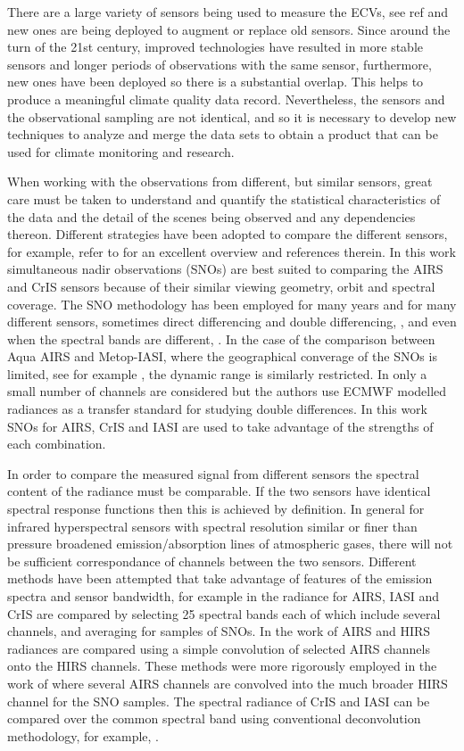 \documentclass[twocolumn,10pt]{article}
\begin{document}
There are a large variety of sensors being used to measure the ECVs, see ref \cite{Hollmann2013} and new ones are being deployed to augment or replace old sensors.  Since around the turn of the 21st century, improved technologies have resulted in more stable sensors and longer periods of observations with the same sensor, furthermore, new ones have been deployed so there is a substantial overlap. This helps to produce a meaningful climate quality data record. Nevertheless, the sensors and the observational sampling are not identical, and so it is necessary to develop new techniques to analyze and merge the data sets to obtain a product that can be used for climate monitoring and research.

When working with the observations from different, but similar sensors, great care must be taken to understand and quantify the statistical characteristics of the data and the detail of the scenes being observed and any dependencies thereon. Different strategies have been adopted to compare the different sensors, for example, refer to \cite{Chander2013} for an excellent overview and references therein. In this work simultaneous nadir observations (SNOs) are best suited to comparing the AIRS and CrIS sensors because of their similar viewing geometry, orbit and spectral coverage. The SNO methodology has been employed for many years and for many different sensors, sometimes direct differencing \cite{Wang2007} and double differencing, \cite{Wang2011}, and even when the spectral bands are different, \cite{Uprety2013}. In the case of the comparison between Aqua AIRS and Metop-IASI, where the geographical converage of the SNOs is limited, see for example \cite{GSICS2008}, the dynamic range is similarly restricted. In \cite{Elliott2009} only a small number of channels are considered but the authors use ECMWF modelled radiances as a transfer standard for studying double differences. In this work SNOs for AIRS, CrIS and IASI are used to take advantage of the strengths of each combination.

In order to compare the measured signal from different sensors the spectral content of the radiance must be comparable. If the two sensors have identical spectral response functions then this is achieved by definition. In general for infrared hyperspectral sensors with spectral resolution similar or finer than pressure broadened emission/absorption lines of atmospheric gases, there will not be sufficient correspondance of channels between the two sensors. Different methods have been attempted that take advantage of features of the emission spectra and sensor bandwidth, for example in \cite{Wang2015} the radiance for AIRS, IASI and CrIS are compared by selecting 25 spectral bands each of which include several channels, and averaging for samples of SNOs. In the work of \cite{Ciren2003} AIRS and HIRS radiances are compared using a simple convolution of selected AIRS channels onto the HIRS channels. These methods were more rigorously employed in the work of \cite{Wang2007} where several AIRS channels are convolved into the much broader HIRS channel for the SNO samples. The spectral radiance of CrIS and IASI can be compared over the common spectral band using conventional deconvolution methodology, for example, \cite{Wang2015}.
\end{document}
